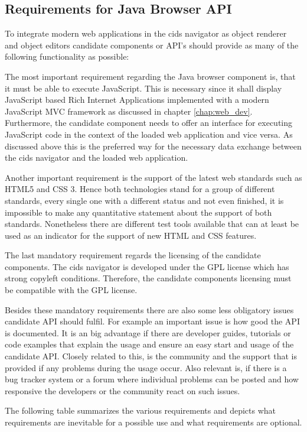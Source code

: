 \subsection{Requirements for Java Browser API}

To integrate modern web applications in the cids navigator as object renderer and object editors candidate components or API's should provide as many of the following functionality as possible:

The most important requirement regarding the Java browser component is, that it must be able to execute JavaScript.
This is necessary since it shall display JavaScript based Rich Internet Applications implemented with a modern JavaScript MVC framework as discussed in chapter \ref{chap:web_dev}.
Furthermore, the candidate component needs to offer an interface for executing JavaScript code in the context of the loaded web application and vice versa.
As discussed above this is the preferred way for the necessary data exchange between the cids navigator and the  loaded web application.

Another important requirement is the support of the latest web standards such as HTML5 and CSS 3.
Hence both technologies stand for a group of different standards, every single one with a different status and not even finished, it is impossible to make any quantitative statement about the support of both standards.
Nonetheless there are different test tools available that can at least be used as an indicator for the support of new HTML and CSS features.

The last mandatory requirement regards the licensing of the candidate components.
The cids navigator is developed under the GPL license which has strong copyleft conditions.
Therefore, the candidate components licensing must be compatible with the GPL license.

Besides these mandatory requirements there are also some less obligatory issues candidate API should fulfil.
For example an important issue is how good the API is documented.
It is an big advantage if there are developer guides, tutorials or code examples that explain the usage and ensure an easy start and usage of the candidate API.
Closely related to this, is the community and the support that is provided if any problems during the usage occur.
Also relevant is, if there is a bug tracker system or a forum where individual problems can be posted and how responsive the developers or the community react on such issues.

The following table summarizes the various requirements and depicts what requirements are inevitable for a possible use and what requirements are optional.


